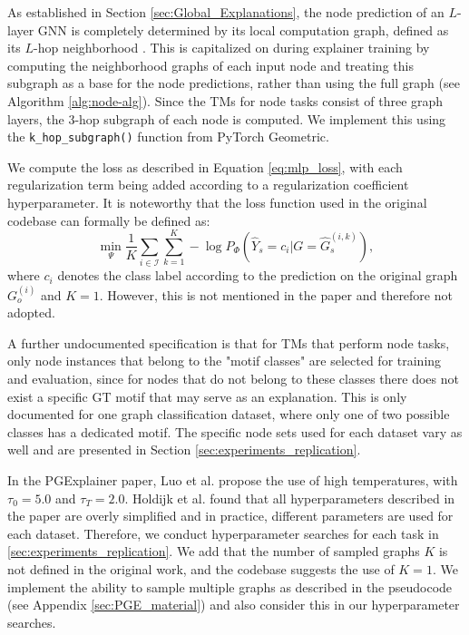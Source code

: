 As established in Section \ref{sec:Global_Explanations}, the node prediction of an $L$-layer GNN is completely determined by its local computation graph, defined as its $L$-hop neighborhood \cite{ying2019gnnexplainer}. This is capitalized on during explainer training by computing the neighborhood graphs of each input node and treating this subgraph as a base for the node predictions, rather than using the full graph (see Algorithm \ref{alg:node-alg}). Since the \acp{TM} for node tasks consist of three graph layers, the $3$-hop subgraph of each node is computed. We implement this using the \lstinline|k_hop_subgraph()| function from PyTorch Geometric. \bigskip

We compute the loss as described in Equation \ref{eq:mlp_loss}, with each regularization term being added according to a regularization coefficient hyperparameter. It is noteworthy that the loss function used in the original codebase can formally be defined as:
\begin{equation}
    \min_\Psi \frac{1}{K}\sum_{i\in \mathcal{I}}\sum_{k=1}^K -\log P_\Phi(\hat{Y}_s = c_i|G=\hat{G}_s^{(i,k)}),
\end{equation}
where $c_i$ denotes the class label according to the prediction on the original graph $G_o^{(i)}$ and $K=1$. However, this is not mentioned in the paper and therefore not adopted.  \bigskip

A further undocumented specification is that for \acp{TM} that perform node tasks, only node instances that belong to the "motif classes" are selected for training and evaluation, since for nodes that do not belong to these classes there does not exist a specific \ac{GT} motif that may serve as an explanation. This is only documented for one graph classification dataset, where only one of two possible classes has a dedicated motif. The specific node sets used for each dataset vary as well and are presented in Section \ref{sec:experiments_replication}.\bigskip

In the PGExplainer paper, Luo et al. \cite{luo2020parameterized} propose the use of high temperatures, with $\tau_0 = 5.0$ and $\tau_T=2.0$. Holdijk et al. \cite{holdijk2021re} found that all hyperparameters described in the paper are overly simplified and in practice, different parameters are used for each dataset. Therefore, we conduct hyperparameter searches for each task in \ref{sec:experiments_replication}. We add that the number of sampled graphs $K$ is not defined in the original work, and the codebase suggests the use of $K=1$. We implement the ability to sample multiple graphs as described in the pseudocode (see Appendix \ref{sec:PGE_material}) and also consider this in our hyperparameter searches. \bigskip

